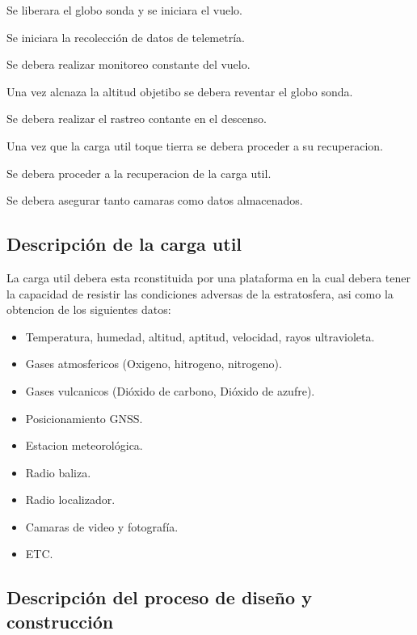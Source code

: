 \documentclass[letterpaper,12pt]{article} %
\begin{document}
    \vspace{5mm}

    Se liberara el globo sonda y se iniciara el vuelo.

    \medskip   \qquad Se iniciara la recolección de datos de telemetría.

    \medskip   \qquad Se debera realizar monitoreo constante del vuelo.

    \medskip   \qquad Una vez alcnaza la altitud objetibo se debera reventar el globo sonda.

    \medskip   \qquad Se debera realizar el rastreo contante en el descenso.
    
    \vspace{5mm}

    Una vez que la carga util toque tierra se debera proceder a su recuperacion.

    \medskip   \qquad Se debera proceder a la recuperacion de la carga util.

    \medskip   \qquad Se debera asegurar tanto camaras como datos almacenados.

    \subsection{Descripción de la carga util}

    La carga util debera esta rconstituida por una plataforma en la cual debera tener 
    la capacidad de resistir las condiciones adversas de la estratosfera, asi como la obtencion
    de los siguientes datos:

    \begin{itemize}
        \item Temperatura, humedad, altitud, aptitud, velocidad, rayos ultravioleta.
        \item Gases atmosfericos (Oxigeno, hitrogeno, nitrogeno).
        \item Gases vulcanicos (Dióxido de carbono, Dióxido de azufre).
        \item Posicionamiento GNSS.
        \item Estacion meteorológica.
        \item Radio baliza.
        \item Radio localizador.
        \item Camaras de video y fotografía.
        \item ETC. 
    \end{itemize}

    \subsection{Descripción del proceso de diseño y construcción}
\end{document}
